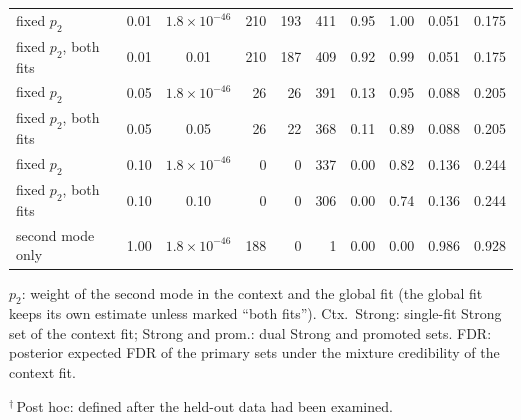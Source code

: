 \begin{table}[htbp]
\begin{tabular}{@{}lccrrrcccc@{}}
fixed $p_2$ & 0.01 & $1.8\times 10^{-46}$ & 210 & 193 & 411 & 0.95 & 1.00 & 0.051 & 0.175 \\
fixed $p_2$, both fits & 0.01 & 0.01 & 210 & 187 & 409 & 0.92 & 0.99 & 0.051 & 0.175 \\
fixed $p_2$ & 0.05 & $1.8\times 10^{-46}$ & 26 & 26 & 391 & 0.13 & 0.95 & 0.088 & 0.205 \\
fixed $p_2$, both fits & 0.05 & 0.05 & 26 & 22 & 368 & 0.11 & 0.89 & 0.088 & 0.205 \\
fixed $p_2$ & 0.10 & $1.8\times 10^{-46}$ & 0 & 0 & 337 & 0.00 & 0.82 & 0.136 & 0.244 \\
fixed $p_2$, both fits & 0.10 & 0.10 & 0 & 0 & 306 & 0.00 & 0.74 & 0.136 & 0.244 \\
second mode only & 1.00 & $1.8\times 10^{-46}$ & 188 & 0 & 1 & 0.00 & 0.00 & 0.986 & 0.928 \\
\bottomrule
\end{tabular}
\par\smallskip
\begin{minipage}{\linewidth}\footnotesize
$p_2$: weight of the second mode in the context and the global fit (the global fit keeps its own estimate unless marked ``both fits''). Ctx.\ Strong: single-fit Strong set of the context fit; Strong and prom.: dual Strong and promoted sets. FDR: posterior expected FDR of the primary sets under the mixture credibility of the context fit.

$^{\dagger}$\,Post hoc: defined after the held-out data had been examined.
\end{minipage}
\end{table}
